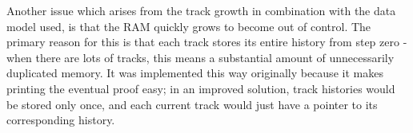 \documentclass{article}
\begin{document}
Another issue which arises from the track growth in combination with the data
model used, is that the RAM quickly grows to become out of control. The primary
reason for this is that each track stores its entire history from step zero -
when there are lots of tracks, this means a substantial amount of unnecessarily
duplicated memory. It was implemented this way originally because it makes 
printing the eventual proof easy; in an improved solution, track histories would
be stored only once, and each current track would just have a pointer to its
corresponding history.
\end{document}

